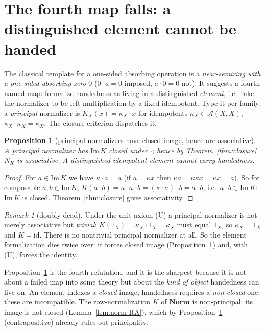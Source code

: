\documentclass[11pt]{amsart}
\theoremstyle{plain}
\newtheorem{proposition}[theorem]{Proposition}
\theoremstyle{definition}
\theoremstyle{remark}
\newtheorem{remark}[theorem]{Remark}
\newcommand{\Norm}{\mathbf{Norm}}
\newcommand{\Img}{\mathrm{Im}\,}
\newcommand{\id}{\mathrm{id}}
\begin{document}
\section{The fourth map falls: a distinguished element cannot be handed}
\label{sec:fourth}

The classical template for a one-sided absorbing operation is a \emph{near-semiring with a one-sided
absorbing zero} $0$ ($0\cdot a=0$ imposed, $a\cdot 0=0$ not). It suggests a fourth named map: formalize
handedness as living in a distinguished \emph{element}, i.e.\ take the normalizer to be
left-multiplication by a fixed idempotent. Type it per family: a \emph{principal} normalizer is
$K_{X}(x)=\kappa_{X}\cdot x$ for idempotents $\kappa_{X}\in\mathcal{A}(X,X)$,
$\kappa_{X}\cdot\kappa_{X}=\kappa_{X}$. The closure criterion dispatches it.

\begin{proposition}[principal normalizers have closed image, hence are associative]
\label{prop:principal}
A principal normalizer has $\Img K$ closed under $\cdot$; hence by Theorem~\ref{thm:closure} $N_{K}$
is associative. A distinguished idempotent element cannot carry handedness.
\end{proposition}
\begin{proof}
For $a\in\Img K$ we have $\kappa\cdot a=a$ (if $a=\kappa x$ then
$\kappa a=\kappa\kappa x=\kappa x=a$). So for composable $a,b\in\Img K$,
$K(a\cdot b)=\kappa\cdot a\cdot b=(\kappa\cdot a)\cdot b=a\cdot b$, i.e.\ $a\cdot b\in\Img K$:
$\Img K$ is closed. Theorem~\ref{thm:closure} gives associativity.
\end{proof}

\begin{remark}[doubly dead]
\label{rem:doubly}
Under the unit axiom \textsf{(U)} a principal normalizer is not merely associative but \emph{trivial}:
$K(1_{X})=\kappa_{X}\cdot 1_{X}=\kappa_{X}$ must equal $1_{X}$, so $\kappa_{X}=1_{X}$ and $K=\id$.
There is no nontrivial principal normalizer at all. So the element formalization dies twice over: it
forces closed image (Proposition~\ref{prop:principal}) and, with \textsf{(U)}, forces the identity.
\end{remark}

Proposition~\ref{prop:principal} is the fourth refutation, and it is the sharpest because it is not
about a failed map into some theory but about the \emph{kind of object} handedness can live on. An
element indexes a \emph{closed} image; handedness requires a \emph{non-closed} one; these are
incompatible. The row-normalization $K$ of $\Norm$ is non-principal: its image is not closed
(Lemma~\ref{lem:norm-RA}), which by Proposition~\ref{prop:principal} (contrapositive) already rules
out principality.
\end{document}
